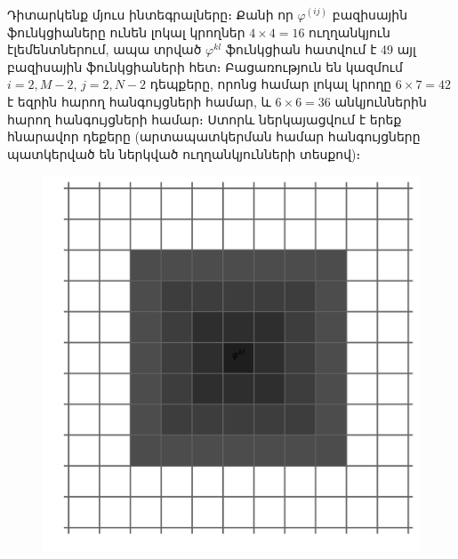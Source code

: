 \documentclass[fleqn, bachelor,subf,12pt,notitlepage]{article}
\begin{document}
Դիտարկենք մյուս ինտեգրալները։ Քանի որ $\varphi^{(ij)}$ բազիսային ֆունկցիաները ունեն լոկալ կրողներ $4 \times 4 = 16$ ուղղանկյուն էլեմենտներում, ապա տրված $\varphi^{kl}$ ֆունկցիան հատվում է 49 այլ բազիսային ֆունկցիաների հետ։ Բացառություն են կազմում $i=2, M-2$, $j=2, N-2$ դեպքերը, որոնց համար լոկալ կրողը $6 \times 7 = 42$ է եզրին հարող հանգույցների համար, և $6 \times 6 = 36$ անկյուններին հարող հանգույցների համար։ Ստորև ներկայացվում է երեք հնարավոր դեքերը (արտապատկերման համար հանգույցները պատկերված են ներկված ուղղանկյունների տեսքով)։
\begin{figure}[H]
  \centering
  \begin{minipage}[b]{0.2\textwidth}
    \includegraphics[width=\textwidth]{images/two_dimensional_basis_intersection}
  \end{minipage}
  \hfill
  \begin{minipage}[b]{0.2\textwidth}

\end{minipage}
\end{figure}
\end{document}
